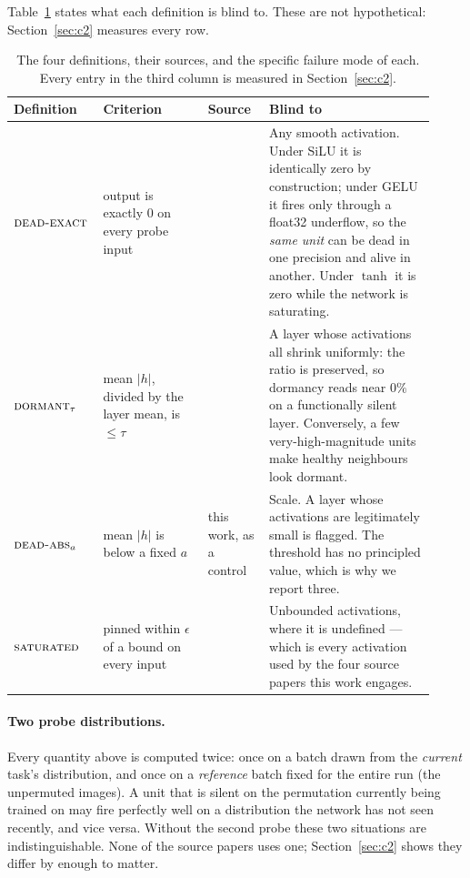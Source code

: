 \documentclass[10pt]{article}
\newcommand{\dexact}{\textsc{dead-exact}}
\newcommand{\ddorm}{\textsc{dormant}_\tau}
\newcommand{\dabs}{\textsc{dead-abs}_a}
\newcommand{\dsat}{\textsc{saturated}}
\begin{document}
\medskip
Table~\ref{tab:defs} states what each definition is blind to. These are not
hypothetical: Section~\ref{sec:c2} measures every row.

\begin{table}[t]
\centering
\caption{The four definitions, their sources, and the specific failure mode of
each. Every entry in the third column is measured in Section~\ref{sec:c2}.}
\label{tab:defs}
\small
\begin{tabular}{@{}p{0.16\linewidth} p{0.24\linewidth} p{0.14\linewidth} p{0.38\linewidth}@{}}
\toprule
\textbf{Definition} & \textbf{Criterion} & \textbf{Source} & \textbf{Blind to} \\
\midrule
$\dexact$ & output is exactly $0$ on every probe input &
\citet{dohare2024loss} &
Any smooth activation. Under SiLU it is identically zero by construction; under
GELU it fires only through a float32 underflow, so the \emph{same unit} can be
dead in one precision and alive in another. Under $\tanh$ it is zero while the
network is saturating. \\
\addlinespace
$\ddorm$ & mean $|h|$, divided by the layer mean, is $\le \tau$ &
\citet{sokar2023dormant} &
A layer whose activations all shrink uniformly: the ratio is preserved, so
dormancy reads near $0\%$ on a functionally silent layer. Conversely, a few
very-high-magnitude units make healthy neighbours look dormant. \\
\addlinespace
$\dabs$ & mean $|h|$ is below a fixed $a$ &
this work, as a control &
Scale. A layer whose activations are legitimately small is flagged. The
threshold has no principled value, which is why we report three. \\
\addlinespace
$\dsat$ & pinned within $\epsilon$ of a bound on every input &
\citet{kooi2024hadamard} &
Unbounded activations, where it is undefined --- which is every activation used
by the four source papers this work engages. \\
\bottomrule
\end{tabular}
\end{table}

\paragraph{Two probe distributions.}
Every quantity above is computed twice: once on a batch drawn from the
\emph{current} task's distribution, and once on a \emph{reference} batch fixed
for the entire run (the unpermuted images). A unit that is silent on the
permutation currently being trained on may fire perfectly well on a distribution
the network has not seen recently, and vice versa. Without the second probe
these two situations are indistinguishable. None of the source papers uses one;
Section~\ref{sec:c2} shows they differ by enough to matter.
\end{document}
